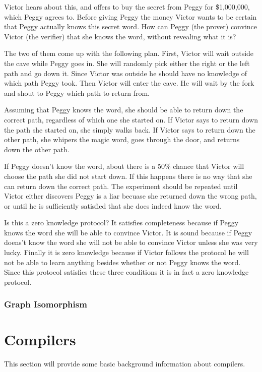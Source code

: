 \documentclass{sig-alternate}
\begin{document}
	Victor hears about this, and offers to buy the secret from Peggy for
	\$1,000,000, which Peggy agrees to. Before giving Peggy the money Victor
	wants to be certain that Peggy actually knows this secret word. How can
	Peggy (the prover) convince Victor (the verifier) that she knows the
	word, without revealing what it is?

	The two of them come up with the following plan. First, Victor will wait
	outside the cave while Peggy goes in. She will randomly pick either the
	right or the left path and go down it. Since Victor was outside he
	should have no knowledge of which path Peggy took. Then Victor will
	enter the cave. He will wait by the fork and shout to Peggy which
	path to return from. 
	
	Assuming that Peggy knows the word, she should be able to return down
	the correct path, regardless of which one she started on. If Victor 
	says to	return down the path she started on, she simply walks back. 
	If Victor says to return down the other path, she whipers the magic
	word, goes through the door, and returns down the other path.

	If Peggy doesn't know the word, about there is a 50\% chance that Victor
	will choose the path she did not start down. If this happens there is
	no way that she can return down the correct path. The experiment should
	be repeated until Victor either discovers Peggy is a liar becuase she
	returned down the wrong path, or until he is sufficiently satisfied
	that she does indeed know the word.

	Is this a zero knowledge protocol? It satisfies completeness because
	if Peggy knows the word she will be able to convince Victor. It is
	sound because if Peggy doens't know the word she will not be able to
	convince Victor unless she was very lucky. Finally it is zero knowledge
	because if Victor follows the protocol he will not be able to learn
	anything besides whether or not Peggy knows the word. Since this
	protocol satisfies these three conditions it is in fact a zero knowledge
	protocol.

	\subsubsection{Graph Isomorphism}
	

\section{Compilers}
	This section will provide some basic background information about compilers.
\end{document}
